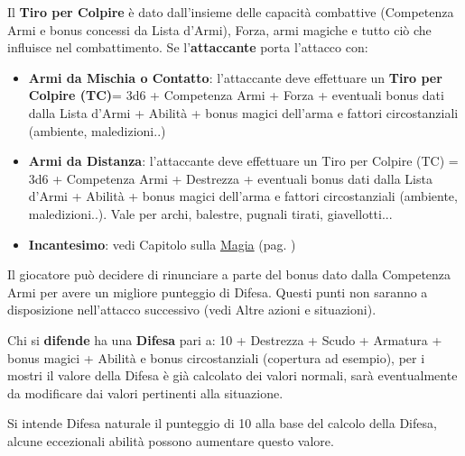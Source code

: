 \begin{multicols}{2}

Il \textbf{Tiro per Colpire} è dato dall'insieme delle capacità combattive (Competenza Armi e bonus concessi da Lista d'Armi), Forza, armi magiche e tutto ciò che influisce nel combattimento. Se l'\textbf{attaccante} porta l'attacco con:

\begin{itemize}[leftmargin=*] \setlength{\itemsep}{0pt}
\item \textbf{Armi da Mischia o Contatto}: l'attaccante deve effettuare un \textbf{Tiro per Colpire (TC)}= 3d6 + Competenza Armi + Forza + eventuali bonus dati dalla Lista d'Armi + Abilità + bonus magici dell'arma e fattori circostanziali (ambiente, maledizioni..)

\item
\textbf{Armi da Distanza}: l'attaccante deve effettuare un Tiro per Colpire (TC) = 3d6 + Competenza Armi + Destrezza + eventuali bonus dati dalla Lista d'Armi + Abilità + bonus magici dell'arma e fattori circostanziali (ambiente, maledizioni..). Vale per archi, balestre, pugnali tirati, giavellotti...

\item
\textbf{Incantesimo}: vedi Capitolo sulla \hyperlink{magietiropercolpireconlemagie}{Magia} (pag. \pageref{magietiropercolpireconlemagie})
\end{itemize}

Il giocatore può decidere di rinunciare a parte del bonus dato dalla Competenza Armi per avere un migliore punteggio di Difesa. Questi punti non saranno a disposizione nell'attacco successivo (vedi Altre azioni e situazioni).





Chi si \textbf{difende} ha una \textbf{Difesa} pari a: 10 + Destrezza + Scudo + Armatura + bonus magici + Abilità e bonus circostanziali (copertura ad esempio), per i mostri il valore della Difesa è già calcolato dei valori normali, sarà eventualmente da modificare dai valori pertinenti alla situazione.

Si intende Difesa naturale il punteggio di 10 alla base del calcolo della Difesa, alcune eccezionali abilità possono aumentare questo valore.


\end{multicols}
